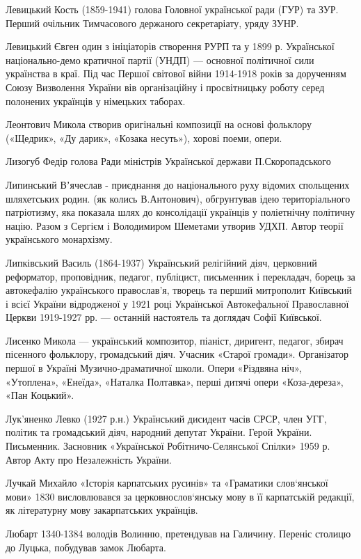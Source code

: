 Левицький Кость (1859-1941) голова Головної української ради (ГУР) та ЗУР. Перший очільник Тимчасового держаного секретаріату, уряду ЗУНР. 

Левицький Євген один з ініціаторів створення  РУРП та у 1899 р. Української національно-демо кратичної партії (УНДП) --- основної політичної сили українства в краї. Під час Першої світової війни 1914-1918 років  за дорученням Союзу Визволення України вів організаційну і просвітницьку роботу серед полонених українців у німецьких таборах. 

Леонтович Микола створив оригінальні композиції на основі фольклору («Щедрик», «Ду дарик», «Козака несуть»), хорові поеми, опери.  

Лизогуб Федір голова Ради міністрів Української держави П.Скоропадського

Липинський Вʼячеслав - приєднання до національного руху відомих спольщених шляхетських родин. (як колись В.Антонович), обгрунтував ідею територіального патріотизму, яка показала шлях до консолідації українців у поліетнічну політичну націю. Разом з Сергієм і Володимиром Шеметами утворив УДХП. Автор теорії українського монархізму.

Липківський Василь (1864-1937) Український релігійний діяч, церковний реформатор, проповідник, педагог, публіцист, письменник і перекладач, борець за автокефалію українського православ’я, творець та перший митрополит Київський і всієї України відродженої у 1921 році Української Автокефальної Православної Церкви 1919-1927 рр. --- останній настоятель та доглядач Софії Київської.

Лисенко Микола --- український композитор, піаніст, диригент, педагог, збирач пісенного фольклору, громадський діяч. Учасник «Старої громади». Організатор першої в Україні Музично-драматичної школи. Опери «Різдвяна ніч», «Утоплена», «Енеїда», «Наталка Полтавка», перші дитячі опери «Коза-дереза», «Пан Коцький». 

Лук’яненко Левко  (1927 р.н.) Український дисидент часів СРСР, член УГГ, політик та громадський діяч, народний депутат України. Герой України. Письменник. Засновник «Української Робітничо-Селянської Спілки» 1959 р. Автор Акту про Незалежність України.

Лучкай Михайло «Історія карпатських русинів» та «Граматики слов‘янської мови» 1830 висловлювався за церковнослов‘янську мову в її карпатській редакції, як літературну мову закарпатських українців.

Любарт 1340-1384 володів Волинню, претендував на Галичину. Переніс столицю до Луцька, побудував замок Любарта.

